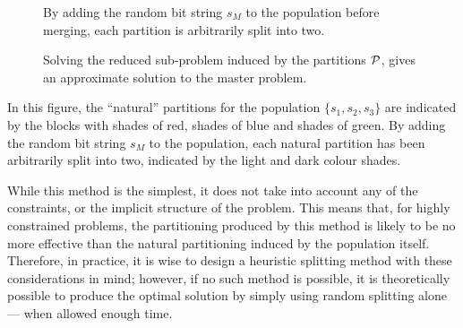 \documentclass[journal]{IEEEtran}
\begin{document}
\begin{figure}[h]
\centering
{}
\caption[Splitting partitions by adding a random bit string]
       {By adding the random bit string $s_M$ to the population before merging, each partition is arbitrarily split into two.}
\label{fig:random_split}
\end{figure}

\begin{figure}[t]
  \centering
  \quad 
  \quad%
  \quad
  \caption{Solving the reduced sub-problem induced by the partitions ${\cal P}$, gives an approximate solution to the master problem.} 
    \label{fig:merge-solve}
\end{figure}

In this figure, the ``natural'' partitions for the population $\{s_1,s_2,s_3\}$ are indicated by the blocks with shades of red, shades of blue and shades of green. By adding the random bit string $s_M$ to the population, each natural partition has been arbitrarily split into two, indicated by the light and dark colour shades.

While this method is the simplest, it does not take into account any of the constraints, or the implicit structure of the problem. This means that, for highly constrained problems, the partitioning produced by this method is likely to be no more effective than the natural partitioning induced by the population itself. Therefore, in practice, it is wise to design a heuristic splitting method with these considerations in mind; however, if no such method is possible, it is theoretically possible to produce the optimal solution by simply using random splitting alone --- when allowed enough time.
\end{document}

